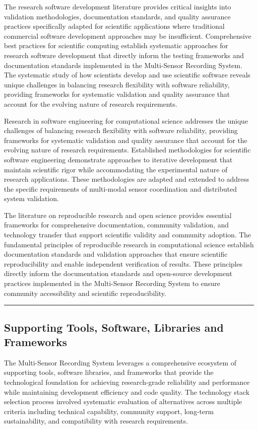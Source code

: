 \documentclass[12pt,a4paper]{report}
\begin{document}
The research software development literature provides critical insights into validation methodologies, documentation
standards, and quality assurance practices specifically adapted for scientific applications where traditional commercial
software development approaches may be insufficient. Comprehensive best practices for scientific computing establish
systematic approaches for research software development that directly inform the testing frameworks and documentation
standards implemented in the Multi-Sensor Recording System. The systematic study of how scientists develop and use
scientific software reveals unique challenges in balancing research flexibility with software reliability, providing
frameworks for systematic validation and quality assurance that account for the evolving nature of research
requirements.

Research in software engineering for computational science addresses the unique challenges of balancing research
flexibility with software reliability, providing frameworks for systematic validation and quality assurance that account
for the evolving nature of research requirements. Established methodologies for scientific software engineering
demonstrate approaches to iterative development that maintain scientific rigor while accommodating the experimental
nature of research applications. These methodologies are adapted and extended to address the specific requirements of
multi-modal sensor coordination and distributed system validation.

The literature on reproducible research and open science provides essential frameworks for comprehensive documentation,
community validation, and technology transfer that support scientific validity and community adoption. The fundamental
principles of reproducible research in computational science establish documentation standards and validation approaches
that ensure scientific reproducibility and enable independent verification of results. These principles directly inform
the documentation standards and open-source development practices implemented in the Multi-Sensor Recording System to
ensure community accessibility and scientific reproducibility.

\hrule

\subsection{Supporting Tools, Software, Libraries and Frameworks}

The Multi-Sensor Recording System leverages a comprehensive ecosystem of supporting tools, software libraries, and
frameworks that provide the technological foundation for achieving research-grade reliability and performance while
maintaining development efficiency and code quality. The technology stack selection process involved systematic
evaluation of alternatives across multiple criteria including technical capability, community support, long-term
sustainability, and compatibility with research requirements.
\end{document}
